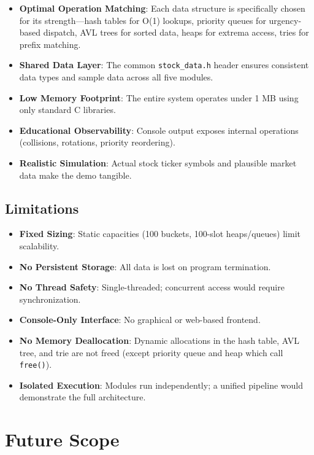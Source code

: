 \documentclass[conference]{IEEEtran}
\begin{document}
\begin{itemize}
\item \textbf{Optimal Operation Matching}: Each data structure is specifically chosen for its strength---hash tables for O(1) lookups, priority queues for urgency-based dispatch, AVL trees for sorted data, heaps for extrema access, tries for prefix matching.
\item \textbf{Shared Data Layer}: The common \texttt{stock\_data.h} header ensures consistent data types and sample data across all five modules.
\item \textbf{Low Memory Footprint}: The entire system operates under 1 MB using only standard C libraries.
\item \textbf{Educational Observability}: Console output exposes internal operations (collisions, rotations, priority reordering).
\item \textbf{Realistic Simulation}: Actual stock ticker symbols and plausible market data make the demo tangible.
\end{itemize}

\subsection{Limitations}

\begin{itemize}
\item \textbf{Fixed Sizing}: Static capacities (100 buckets, 100-slot heaps/queues) limit scalability.
\item \textbf{No Persistent Storage}: All data is lost on program termination.
\item \textbf{No Thread Safety}: Single-threaded; concurrent access would require synchronization.
\item \textbf{Console-Only Interface}: No graphical or web-based frontend.
\item \textbf{No Memory Deallocation}: Dynamic allocations in the hash table, AVL tree, and trie are not freed (except priority queue and heap which call \texttt{free()}).
\item \textbf{Isolated Execution}: Modules run independently; a unified pipeline would demonstrate the full architecture.
\end{itemize}

\section{Future Scope}
\end{document}
